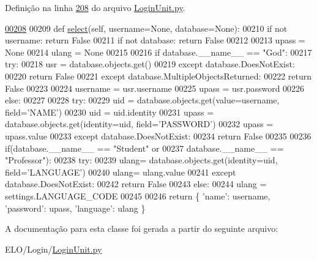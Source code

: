 Definição na linha \hyperlink{LoginUnit_8py_source_l00208}{208} do arquivo \hyperlink{LoginUnit_8py_source}{Login\-Unit.\-py}.


\begin{DoxyCode}
\hypertarget{classLogin_1_1LoginUnit_1_1PersLogin_l00208}{}\hyperlink{classLogin_1_1LoginUnit_1_1PersLogin_a1847dbd744377283add2327d2eb0b99f}{00208} 
00209     \textcolor{keyword}{def }\hyperlink{classLogin_1_1LoginUnit_1_1PersLogin_a1847dbd744377283add2327d2eb0b99f}{select}(self, username=None, database=None):
00210         \textcolor{keywordflow}{if} \textcolor{keywordflow}{not} username: \textcolor{keywordflow}{return} \textcolor{keyword}{False}
00211         \textcolor{keywordflow}{if} \textcolor{keywordflow}{not} database: \textcolor{keywordflow}{return} \textcolor{keyword}{False}
00212 
00213         upass = \textcolor{keywordtype}{None}
00214         ulang = \textcolor{keywordtype}{None}
00215 
00216         \textcolor{keywordflow}{if} database.\_\_name\_\_ == \textcolor{stringliteral}{"God"}:
00217             \textcolor{keywordflow}{try}:
00218                 usr = database.objects.get()
00219             \textcolor{keywordflow}{except} database.DoesNotExist:
00220                 \textcolor{keywordflow}{return} \textcolor{keyword}{False}
00221             \textcolor{keywordflow}{except} database.MultipleObjectsReturned:
00222                 \textcolor{keywordflow}{return} \textcolor{keyword}{False}
00223 
00224             username = usr.username
00225             upass = usr.password
00226         \textcolor{keywordflow}{else}:
00227 
00228             \textcolor{keywordflow}{try}:
00229                 uid = database.objects.get(value=username, field=\textcolor{stringliteral}{'NAME'})
00230                 uid = uid.identity
00231                 upass = database.objects.get(identity=uid, field=\textcolor{stringliteral}{'PASSWORD'})
00232                 upass = upass.value
00233             \textcolor{keywordflow}{except} database.DoesNotExist:
00234                 \textcolor{keywordflow}{return} \textcolor{keyword}{False}
00235 
00236             if(database.\_\_name\_\_ == \textcolor{stringliteral}{"Student"} \textcolor{keywordflow}{or} 
00237                database.\_\_name\_\_ == \textcolor{stringliteral}{"Professor"}):
00238                 \textcolor{keywordflow}{try}:
00239                     ulang= database.objects.get(identity=uid, field=\textcolor{stringliteral}{'LANGUAGE'})
00240                     ulang= ulang.value
00241                 \textcolor{keywordflow}{except} database.DoesNotExist:
00242                     \textcolor{keywordflow}{return} \textcolor{keyword}{False}
00243             \textcolor{keywordflow}{else}:
00244                 ulang = settings.LANGUAGE\_CODE
00245 
00246         \textcolor{keywordflow}{return} \{ \textcolor{stringliteral}{'name'}: username, \textcolor{stringliteral}{'password'}: upass, \textcolor{stringliteral}{'language'}: ulang \}
\end{DoxyCode}


A documentação para esta classe foi gerada a partir do seguinte arquivo\-:\begin{DoxyCompactItemize}
\item 
E\-L\-O/\-Login/\hyperlink{LoginUnit_8py}{Login\-Unit.\-py}\end{DoxyCompactItemize}
